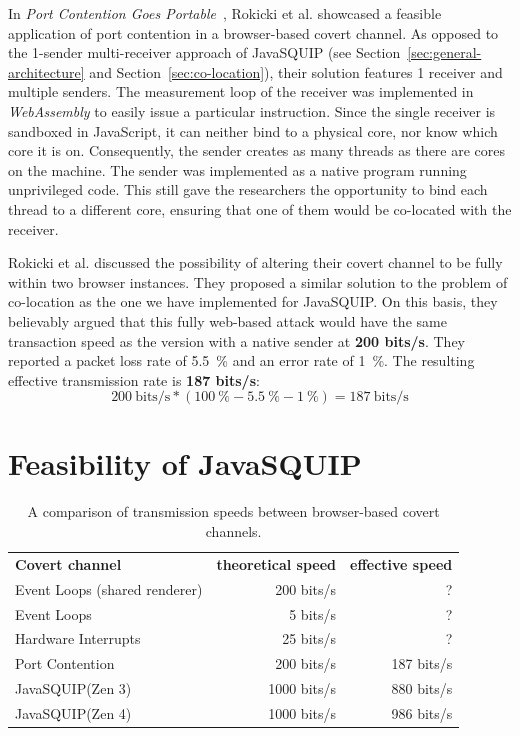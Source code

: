 \documentclass[11pt,
  titlepage=false,
  parskip=half,      %
]{scrreprt}
\begin{document}
In \textit{Port Contention Goes Portable}~\cite{Rokicki2022webport},
Rokicki et al. showcased a feasible application of port contention in a browser-based covert channel.
As opposed to the 1-sender multi-receiver approach of JavaSQUIP (see Section~\ref{sec:general-architecture} and Section~\ref{sec:co-location}),
their solution features 1 receiver and multiple senders.
The measurement loop of the receiver was implemented in \textit{WebAssembly} to easily issue a particular instruction.
Since the single receiver is sandboxed in JavaScript, it can neither bind to a physical core, nor know which core it is on.
Consequently, the sender creates as many threads as there are cores on the machine.
The sender was implemented as a native program running unprivileged code.
This still gave the researchers the opportunity to bind each thread to a different core,
ensuring that one of them would be co-located with the receiver.

Rokicki et al. discussed the possibility of altering their covert channel to be fully within two browser instances.
They proposed a similar solution to the problem of co-location as the one we have implemented for JavaSQUIP.
On this basis, they believably argued that this fully web-based attack would have the same transaction speed as the version
with a native sender at \textbf{200 bits/s}.
They reported a packet loss rate of 5.5~\% and an error rate of 1~\%.
The resulting effective transmission rate is \textbf{187 bits/s}:
\[200~\text{bits/s} * (100~\% - 5.5~\% - 1~\%) = 187~\text{bits/s}\]

\section{Feasibility of JavaSQUIP}


\begin{table}[t]
\centering
\begin{tabular}{ |l|r|r| }
\hline
\textbf{Covert channel} & \textbf{theoretical speed} & \textbf{effective speed} \\
\Xhline{2pt}
Event Loops (shared renderer) & 200 bits/s & ? \\
\hline
Event Loops & 5 bits/s & ? \\
\hline
Hardware Interrupts & 25 bits/s & ? \\
\hline
Port Contention & 200 bits/s & 187 bits/s \\
\hline
JavaSQUIP(Zen 3) & 1000 bits/s & 880 bits/s\\
\hline
JavaSQUIP(Zen 4) & 1000 bits/s & 986 bits/s\\
\hline
\end{tabular}

\caption{A comparison of transmission speeds between browser-based covert channels.}
\label{tab:speedcomparison}
\end{table}
\end{document}
